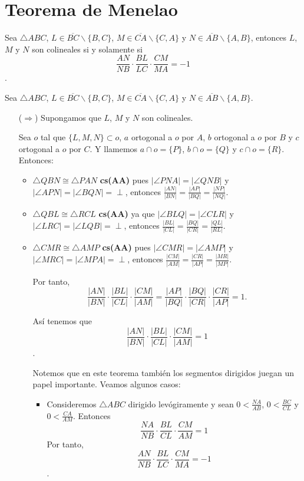 \chapter{Teorema de Menelao}
\begin{teo}\label{Teo de Menelao}
Sea $\triangle ABC$, $L\in\overline{BC}\backslash \{B,C\}$, $M\in\overline{CA}\backslash \{C,A\}$ y $N\in\overline{AB}\backslash \{A,B\}$, entonces $L$, $M$ y $N$ son colineales si y solamente si 
$$\frac{AN}{NB}\cdot\frac{BL}{LC}\cdot\frac{CM}{MA}=-1$$.
\end{teo}
\begin{dem} Sea $\triangle ABC$, $L\in\overline{BC}\backslash \{B,C\}$, $M\in\overline{CA}\backslash \{C,A\}$ y $N\in\overline{AB}\backslash \{A,B\}$.
\begin{enumerate}
\item[($\Rightarrow$)] Supongamos que $L$, $M$ y $N$ son colineales.

Sea $o$ tal que $\{L,M,N\}\subset o$, $a$ ortogonal a $o$ por $A$, $b$ ortogonal a $o$ por $B$ y $c$ ortogonal a $o$ por $C$. Y llamemos $a\cap o=\{P\}$, $b\cap o=\{Q\}$ y $c\cap o=\{R\}$.
Entonces:

\begin{itemize}
\item $\triangle QBN\cong\triangle PAN$ \textbf{cs(AA)} pues $|\angle PNA|=|\angle QNB|$ y $|\angle APN|=|\angle BQN|=\perp$, entonces $\frac{|AN|}{|BN|}=\frac{|AP|}{|BQ|}=\frac{|NP|}{|NQ|}$.
\item $\triangle QBL\cong\triangle RCL$ \textbf{cs(AA)} ya que $|\angle BLQ|=|\angle CLR|$ y $|\angle LRC|=|\angle LQB|=\perp$, entonces $\frac{|BL|}{|CL|}=\frac{|BQ|}{|CR|}=\frac{|QL|}{|RL|}$.
\item $\triangle CMR\cong\triangle AMP$ \textbf{cs(AA)} pues $|\angle CMR|=|\angle AMP|$ y $|\angle MRC|=|\angle MPA|=\perp$, entonces $\frac{|CM|}{|AM|}=\frac{|CR|}{|AP|}=\frac{|MR|}{|MP|}$.

Por tanto, 
$$\frac{|AN|}{|BN|}\cdot\frac{|BL|}{|CL|}\cdot\frac{|CM|}{|AM|}=\frac{|AP|}{|BQ|}\cdot\frac{|BQ|}{|CR|}\cdot\frac{|CR|}{|AP|}=1.$$

Así tenemos que $$\frac{|AN|}{|BN|}\cdot\frac{|BL|}{|CL|}\cdot\frac{|CM|}{|AM|}=1$$.

Notemos que en este teorema también los segmentos dirigidos juegan un papel importante. 
Veamos algunos casos:
\begin{itemize}
\item Consideremos $\triangle ABC$ dirigido levógiramente y sean $0<\frac{NA}{AB}$, $0<\frac{BC}{CL}$ y $0<\frac{CA}{AM}$. Entonces
$$\frac{NA}{NB}\cdot\frac{BL}{CL}\cdot\frac{CM}{AM}=1$$
Por tanto, 
$$\frac{AN}{NB}\cdot\frac{BL}{LC}\cdot\frac{CM}{MA}=-1$$.


\end{itemize}
\end{itemize}
\end{enumerate}
\end{dem}
